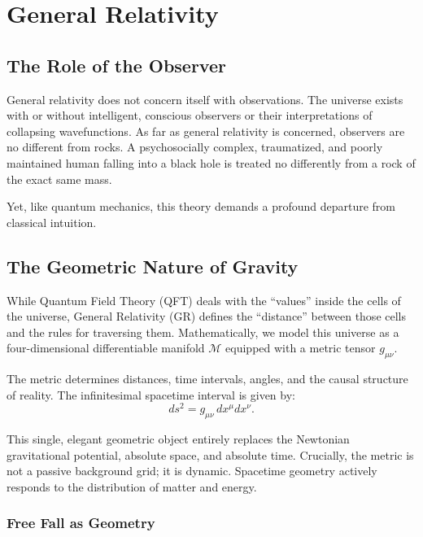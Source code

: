 \chapter{General Relativity}
\label{chap:general-relativity}

\section{The Role of the Observer}

General relativity does not concern itself with observations.
The universe exists with or without intelligent, conscious observers or their interpretations of collapsing wavefunctions.
As far as general relativity is concerned, observers are no different from rocks.
A psychosocially complex, traumatized, and poorly maintained human falling into a black hole is treated no differently from a rock of the exact same mass.

Yet, like quantum mechanics, this theory demands a profound departure from classical intuition.


\section{The Geometric Nature of Gravity}

While Quantum Field Theory (QFT) deals with the ``values'' inside the cells of the universe, General Relativity (GR) defines the ``distance'' between those cells and the rules for traversing them.
Mathematically, we model this universe as a four-dimensional differentiable manifold $\mathcal{M}$ equipped with a metric tensor $g_{\mu\nu}$.

The metric determines distances, time intervals, angles, and the causal structure of reality.
The infinitesimal spacetime interval is given by:
\begin{equation}
ds^2 = g_{\mu\nu} \, dx^\mu dx^\nu.
\end{equation}

This single, elegant geometric object entirely replaces the Newtonian gravitational potential, absolute space, and absolute time.
Crucially, the metric is not a passive background grid; it is dynamic.
Spacetime geometry actively responds to the distribution of matter and energy.

\subsection*{Free Fall as Geometry}

